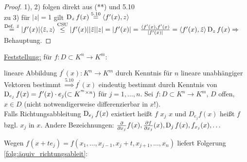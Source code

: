 \begin{proof}
    1), 2) folgen direkt aus (**) und 5.10\\
    zu 3) für $\vert z \vert = 1$ gilt $\operatorname{D}_z f(x) \overset{5.10}{=} \langle f^{\prime}(x), z \rangle$ $\overset{\text{Def. } \bar{z}}{=} \vert f^{\prime}(x)\vert \langle \tilde{z}, z\rangle \overset{\text{CSU}}{\leq} \vert f^{\prime}(x)\vert \vert \tilde{z}\vert \vert z\vert = \vert f^{\prime}(x)\vert = \frac{\langle f^{\prime}(x),f^{\prime}(x)}{\vert f^{\prime}(x) \vert} = \langle f^{\prime}(x), \tilde{z}\rangle \operatorname{D}_z f(x) \Rightarrow$ Behauptung. %
\end{proof}

    \underline{Feststellung:} für $f: D \subset K^n \to K^m$:
    \begin{definition}
        lineare Abbildung $f^{\prime}(x): K^n \to K^m$ durch Kenntnis für $n$ lineare unabhängiger Vektoren bestimmt $\overset{5.10}{\Rightarrow} f^{\prime}(x)$ eindeutig bestimmt durch Kenntnis von $\operatorname{D}_{e_j}f(x) = f^{\prime}(x)\cdot e_j (\subset K^{^m\times n})$ für $j = 1,\dots,n$. Sei $f: D\subset K^n \to K^m$, $D$ offen, $x \in D$ (nicht notwendigerweise differenzierbar in $x$!).\\
        Falls Richtungsabbleitung $\operatorname{D}_{e_j}f(x)$ existiert heißt $f$  $x_j$  $x$ und $D_{e_j}f(x)$ heißt   $f$ bzgl. $x_j$ in $x$.
        Andere Bezeichnungen: $\frac{\partial}{\partial x_j}f(x),\frac{\partial f}{\partial x_j}(x), \operatorname{D}_j f(x),f_{x_j}(x),\dots$
    \end{definition}

    Wegen $f(x+te_j) = f(x_1,\dots,x_{j-1},x_j+t,x_{j+1},\dots,x_n)$ liefert Folgerung \ref{folg:äquiv_richtungsableit}:
    
